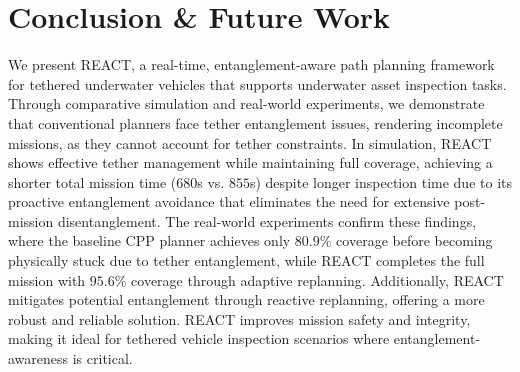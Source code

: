 
\section{Conclusion & Future Work}
\label{sec:conclusion}
We present \ac{REACT}, a real-time, entanglement-aware path planning framework for tethered underwater vehicles that supports underwater asset inspection tasks. Through comparative simulation and real-world experiments, we demonstrate that conventional planners face tether entanglement issues, rendering incomplete missions, as they cannot account for tether constraints. In simulation, \ac{REACT} shows effective tether management while maintaining full coverage, achieving a shorter total mission time ($680$s vs. $855$s) despite longer inspection time due to its proactive entanglement avoidance that eliminates the need for extensive post-mission disentanglement. The real-world experiments confirm these findings, where the baseline \ac{CPP} planner achieves only $80.9\%$ coverage before becoming physically stuck due to tether entanglement, while \ac{REACT} completes the full mission with $95.6\%$ coverage through adaptive replanning. Additionally, \ac{REACT} mitigates potential entanglement through reactive replanning, offering a more robust and reliable solution. \ac{REACT} improves mission safety and integrity, making it ideal for tethered vehicle inspection scenarios where entanglement-awareness is critical.






